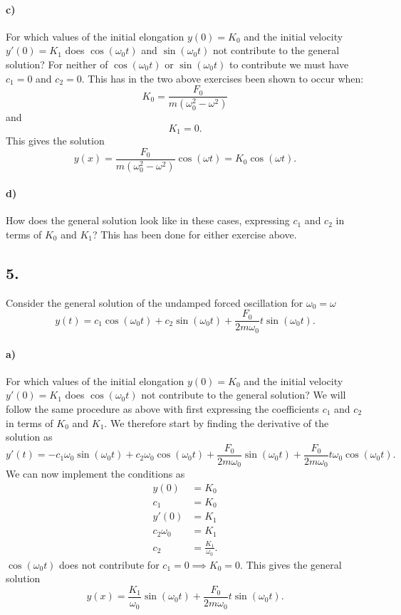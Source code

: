 \paragraph{c)} For which values of the initial elongation $y(0) = K_0$ and the initial velocity $y'(0) = K_1$ does $\cos (\omega_0 t)$ and $\sin (\omega_0 t)$ not contribute to the general solution?
\bigbreak
For neither of $\cos(\omega_0 t)$ or $\sin(\omega_0 t)$ to contribute we must have $c_1 = 0$ and $c_2 = 0$. This has in the two above exercises been shown to occur when:
\[ 
K_0 = \frac{F_0}{m \left( \omega_0^2 - \omega^2 \right)}
\]
and
\[ 
K_1 = 0
.\]
This gives the solution
\[ 
y(x) = \frac{F_0}{m \left( \omega_0^2 - \omega^2 \right)} \cos(\omega t) = K_0 \cos(\omega t)
.\]


\paragraph{d)} How does the general solution look like in these cases, expressing $c_1$ and $c_2$ in terms of $K_0$ and $K_1$?
\bigbreak
This has been done for either exercise above.


\subsection*{5.} Consider the general solution of the undamped forced oscillation for $\omega_0 = \omega$
\[ 
y(t) = c_1 \cos(\omega_0 t) + c_2 \sin \left( \omega_0 t \right) + \frac{F_0}{2m\omega_0}t \sin \left( \omega_0 t \right)
.\]

\paragraph{a)} For which values of the initial elongation $y(0) = K_0$ and the initial velocity $y'(0) = K_1$ does $\cos(\omega_0 t)$ not contribute to the general solution? 
\bigbreak
We will follow the same procedure as above with first expressing the coefficients $c_1$ and $c_2$ in terms of $K_0$ and $K_1$. We therefore start by finding the derivative of the solution as
\[ 
y'(t) = - c_1 \omega_0 \sin(\omega_0 t) + c_2 \omega_0 \cos(\omega_0 t) + \frac{F_0}{2m \omega_0} \sin(\omega_0 t) + \frac{F_0}{2m \omega_0} t \omega_0 \cos(\omega_0 t)
.\]
We can now implement the conditions as
\begin{align*}
  y(0) &= K_0 \\
  c_1 &= K_0 \\
  y'(0) &= K_1 \\
  c_2 \omega_0 &= K_1 \\
  c_2 &= \frac{K_1}{\omega_0}
.\end{align*}
$\cos(\omega_0 t)$ does not contribute for $c_1 = 0 \implies K_0 = 0$. This gives the general solution
\[ 
y(x) = \frac{K_1}{\omega_0} \sin (\omega_0 t) + \frac{F_0}{2m \omega_0} t \sin(\omega_0 t)
.\]


